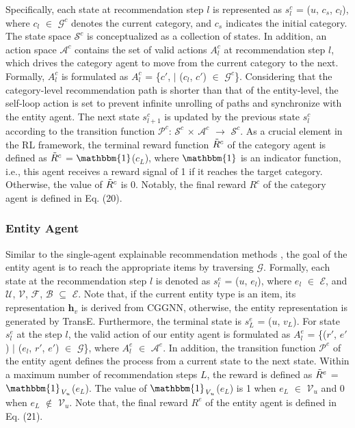 \documentclass[conference]{IEEEtran}
\begin{document}
Specifically, each state at recommendation step $l$ is represented as $s_l^c$ = ($u$, $c_s$, $c_l$), where $c_l$ $\in$ $\mathcal{G}^c$ denotes the current category, and $c_s$ indicates the initial category. The state space $\mathcal{S}^c$ is conceptualized as a collection of states. In addition, an action space $\mathcal{A}^c$ contains the set of valid actions $A_l^c$ at recommendation step $l$, which drives the category agent to move from the current category to the next. Formally, $A_l^c$ is formulated as $A_l^c$ = \{$c'$, $\mid$ ($c_l$, $c'$) $\in$ $\mathcal{G}^c$\}. Considering that the category-level recommendation path is shorter than that of the entity-level, the self-loop action is set to prevent infinite unrolling of paths and synchronize with the entity agent. %
The next state $s_{l+1}^c$ is updated by the previous state $s_{l}^c$ according to the transition function  $\mathcal{P}^c$: $\mathcal{S}^c$ $\times$ $\mathcal{A}^c$ $\rightarrow$ $\mathcal{S}^c$. As a crucial element in the RL framework, the terminal reward function $\Tilde{R}^c$ of the category agent is defined as $\Tilde{R}^c$ = $\mathbbm{1}$($c_L$), where $\mathbbm{1}$ is an indicator function, i.e., this agent receives a reward signal of 1 if it reaches the target category. Otherwise, the value of $\Tilde{R}^c$ is 0. Notably, the final reward $R^{c}$ of the category agent is defined in Eq. (20).

\subsubsection{Entity Agent}
Similar to the single-agent explainable recommendation methods \cite{PGPR} \cite{ADAC} \cite{UCPR},  the goal of the entity agent is to reach the appropriate items by traversing $\mathcal{G}$. Formally, each state at the recommendation step $l$ is denoted as $s_l^e$ = ($u$, $e_l$), where $e_l$ $\in$ $\mathcal{E}$, and $\mathcal{U}$, $\mathcal{V}$, $\mathcal{F}$, $\mathcal{B}$ $\subseteq$ $\mathcal{E}$. Note that, if the current entity type is an item, its representation $\textbf{h}_{v}$ is derived from CGGNN, otherwise, the entity representation is generated by TransE. Furthermore, the terminal state is $s_L^e$ = ($u$, $v_L$). For state $s_l^e$ at the step  $l$, the valid action of our entity agent is formulated as $A^e_l$ = \{($r'$, $e'$) $\mid$ ($e_l$, $r'$, $e'$) $\in$ $\mathcal{G}$\}, where $A^e_l$ $\in$ $\mathcal{A}^e$.  In addition, the transition function $\mathcal{P}^e$ of the entity agent defines the process from a current state to the next state. Within a maximum number of recommendation steps $L$, the reward is defined as $\Tilde{R}^e$ = $\mathbbm{1}_{\emph{V}_u}$($e_L$). The value of $\mathbbm{1}_{\emph{V}_u}$($e_L$) is 1 when $e_L$ $\in$ $\mathcal{V}_u$ and 0 when $e_L$ $\not \in$ $\mathcal{V}_u$. Note that, the final reward $R^{e}$ of the entity agent is defined in Eq. (21).
\end{document}
